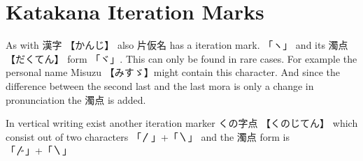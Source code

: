 \section{Katakana Iteration Marks} \label{sec:Iteration}

As with {漢字} {【かんじ】} also {片仮名} has a iteration mark.  「ヽ」 and its
{濁点} {【だくてん】} form {「ヾ」}. This can only be
found in rare cases. For example the personal name Misuzu 【みすゞ】might
contain this character. And since the difference between the second last
and the last mora is only a change in pronunciation the {濁点} is added.

In vertical writing exist another iteration marker {くの字点} {【くのじてん】}
which consist out of two characters {「〳」+「〵」} and the {濁点} form
is {「〴」+「〵」}

